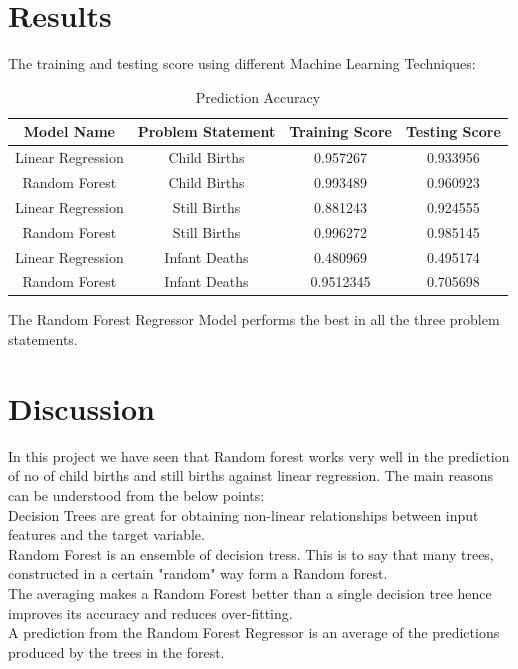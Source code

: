 \documentclass[12pt]{article}
\begin{document}
\section{Results}
The training and testing score using different Machine Learning Techniques:


\begin{table}[h]
    \centering
    \begin{tabular}{||c c c c||}

\hline
Model Name&Problem Statement&Training Score&Testing Score  \\[1ex]
 \hline \hline
Linear Regression&Child Births&0.957267 &0.933956 \\[1ex]
 \hline
Random Forest&Child Births&0.993489&0.960923\\[1ex]
\hline
Linear Regression&Still Births&0.881243&0.924555\\[1ex]
\hline
Random Forest&Still Births&0.996272&0.985145\\[1ex]
\hline
Linear Regression&Infant Deaths&0.480969&0.495174\\[1ex]
\hline
Random Forest&Infant Deaths&0.9512345&0.705698\\[1ex]
\hline

\end{tabular}
    \caption{Prediction Accuracy}

\end{table}

The Random Forest Regressor Model performs the best in all the three problem statements.


\section{Discussion}
In this project we have seen that Random forest works very well in the prediction of no of child births and still births against linear regression. The main reasons can be understood from the below points:\\
Decision Trees are great for obtaining non-linear relationships between input features and the target variable.\\
Random Forest is an ensemble of decision tress. This is to say that many trees, constructed in a certain "random" way form a Random forest.\\
The averaging makes a Random Forest better than a single decision tree hence improves its accuracy and reduces over-fitting.\\
A prediction from the Random Forest Regressor is an average of the predictions produced by the trees in the forest.\\
\end{document}
